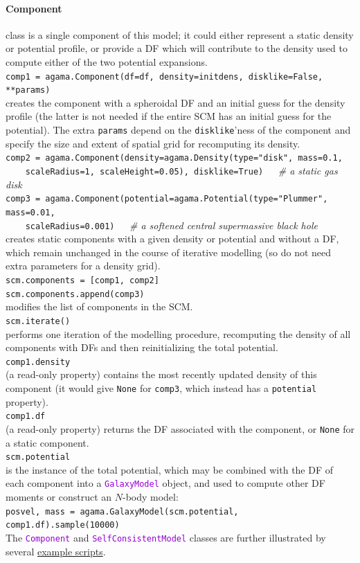 \documentclass[12pt]{article}
\newcommand{\ttt}[1]{\textcolor{darkviolet}{\texttt{#1}}}
\let\oldparagraph\paragraph
\renewcommand{\paragraph}[1]{\vspace{-2mm}\oldparagraph{#1}}
\begin{document}
\paragraph{Component} class is a single component of this model; it could either represent a static density or potential profile, or provide a DF which will contribute to the density used to compute either of the two potential expansions.\\[2mm]
\texttt{comp1 = agama.Component(df=df, density=initdens, disklike=False, **params)}\\
creates the component with a spheroidal DF and an initial guess for the density profile (the latter is not needed if the entire SCM has an initial guess for the potential). The extra \texttt{params} depend on the \texttt{disklike}'ness of the component and specify the size and extent of spatial grid for recomputing its density.\\[1mm]
\texttt{comp2 = agama.Component(density=agama.Density(type="disk", mass=0.1,\\
\mbox{}~~~~scaleRadius=1, scaleHeight=0.05), disklike=True)\ \ \ }\textit{\color{Sepia}\# a static gas disk}\\
\texttt{comp3 = agama.Component(potential=agama.Potential(type="Plummer", mass=0.01,\\
\mbox{}~~~~scaleRadius=0.001)\ \ \ }\textit{\color{Sepia}\# a softened central supermassive black hole}\\
creates static components with a given density or potential and without a DF, which remain unchanged in the course of iterative modelling (so do not need extra parameters for a density grid).\\[2mm]
\texttt{scm.components = [comp1, comp2]}\\
\texttt{scm.components.append(comp3)}\\
modifies the list of components in the SCM.\\[2mm]
\texttt{scm.iterate()}\\
performs one iteration of the modelling procedure, recomputing the density of all components with DFs and then reinitializing the total potential.\\[2mm]
\texttt{comp1.density}\\
(a read-only property) contains the most recently updated density of this component (it would give \texttt{None} for \texttt{comp3}, which instead has a \texttt{potential} property). \\[2mm]
\texttt{comp1.df}\\
(a read-only property) returns the DF associated with the component, or \texttt{None} for a static component.\\[2mm]
\texttt{scm.potential}\\ is the instance of the total potential, which may be combined with the DF of each component into a \ttt{GalaxyModel} object, and used to compute other DF moments or construct an $N$-body model:\\
\texttt{posvel, mass = agama.GalaxyModel(scm.potential, comp1.df).sample(10000)}\\[2mm]
The \ttt{Component} and \ttt{SelfConsistentModel} classes are further illustrated by several \hyperref[sec:ExampleSCM]{example scripts}.
\end{document}
